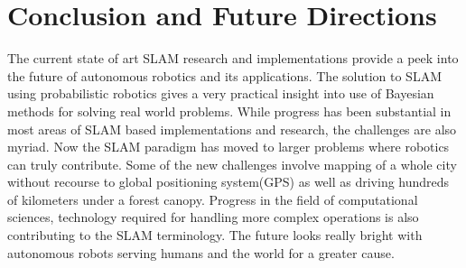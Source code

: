 \documentclass[conference]{IEEEtran}
\begin{document}
\section{Conclusion and Future Directions}
\label{sec:conclusion}
The current state of art SLAM research and implementations provide a peek into the future of autonomous robotics and its applications. The solution to SLAM using probabilistic robotics gives a very practical insight into use of Bayesian methods for solving real world problems. While progress has been substantial in most areas of SLAM based implementations and research, the challenges are also myriad. Now the SLAM paradigm has moved to larger problems where robotics can truly contribute. Some of the new challenges involve mapping of a whole city without recourse to global positioning system(GPS) as well as driving hundreds of kilometers under a forest canopy. Progress in the field of computational sciences, technology required for handling more complex operations is also contributing to the SLAM terminology. The future looks really bright with autonomous robots serving humans and the world for a greater cause.



\end{document}
